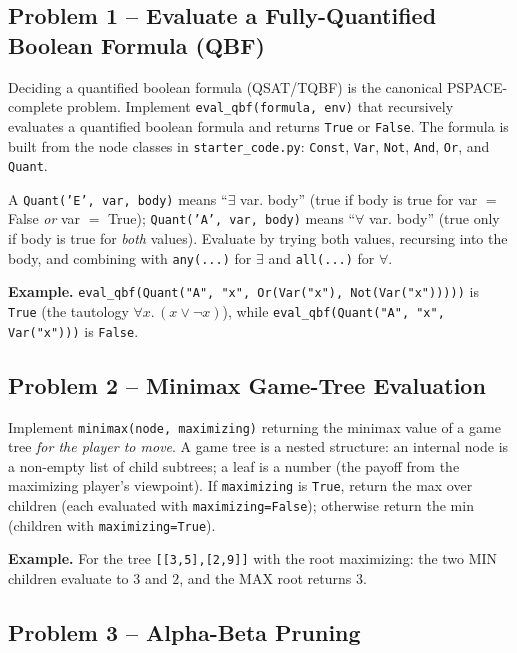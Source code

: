 \documentclass[11pt]{article}
\begin{document}
\subsection*{Problem 1 -- Evaluate a Fully-Quantified Boolean Formula (QBF)}

Deciding a quantified boolean formula (QSAT/TQBF) is the canonical
PSPACE-complete problem. Implement \texttt{eval\_qbf(formula, env)} that
recursively evaluates a quantified boolean formula and returns \texttt{True} or
\texttt{False}. The formula is built from the node classes in
\texttt{starter\_code.py}: \texttt{Const}, \texttt{Var}, \texttt{Not},
\texttt{And}, \texttt{Or}, and \texttt{Quant}.

A \texttt{Quant('E', var, body)} means ``$\exists$ var. body'' (true if body is
true for var $=$ False \emph{or} var $=$ True); \texttt{Quant('A', var, body)}
means ``$\forall$ var. body'' (true only if body is true for \emph{both}
values). Evaluate by trying both values, recursing into the body, and combining
with \texttt{any(...)} for $\exists$ and \texttt{all(...)} for $\forall$.

\textbf{Example.} \texttt{eval\_qbf(Quant("A", "x", Or(Var("x"),
Not(Var("x")))))} is \texttt{True} (the tautology $\forall x.\,(x \lor \lnot
x)$), while \texttt{eval\_qbf(Quant("A", "x", Var("x")))} is \texttt{False}.

\subsection*{Problem 2 -- Minimax Game-Tree Evaluation}

Implement \texttt{minimax(node, maximizing)} returning the minimax value of a
game tree \emph{for the player to move}. A game tree is a nested structure: an
internal node is a non-empty list of child subtrees; a leaf is a number (the
payoff from the maximizing player's viewpoint). If \texttt{maximizing} is
\texttt{True}, return the max over children (each evaluated with
\texttt{maximizing=False}); otherwise return the min (children with
\texttt{maximizing=True}).

\textbf{Example.} For the tree \texttt{[[3,5],[2,9]]} with the root maximizing:
the two MIN children evaluate to $3$ and $2$, and the MAX root returns $3$.

\subsection*{Problem 3 -- Alpha-Beta Pruning}
\end{document}
